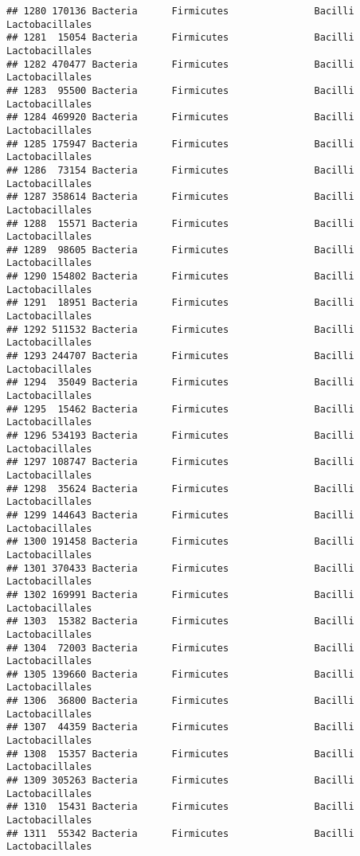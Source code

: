 \documentclass[
]{article}
\begin{document}
\begin{verbatim}
## 1280 170136 Bacteria      Firmicutes               Bacilli     Lactobacillales
## 1281  15054 Bacteria      Firmicutes               Bacilli     Lactobacillales
## 1282 470477 Bacteria      Firmicutes               Bacilli     Lactobacillales
## 1283  95500 Bacteria      Firmicutes               Bacilli     Lactobacillales
## 1284 469920 Bacteria      Firmicutes               Bacilli     Lactobacillales
## 1285 175947 Bacteria      Firmicutes               Bacilli     Lactobacillales
## 1286  73154 Bacteria      Firmicutes               Bacilli     Lactobacillales
## 1287 358614 Bacteria      Firmicutes               Bacilli     Lactobacillales
## 1288  15571 Bacteria      Firmicutes               Bacilli     Lactobacillales
## 1289  98605 Bacteria      Firmicutes               Bacilli     Lactobacillales
## 1290 154802 Bacteria      Firmicutes               Bacilli     Lactobacillales
## 1291  18951 Bacteria      Firmicutes               Bacilli     Lactobacillales
## 1292 511532 Bacteria      Firmicutes               Bacilli     Lactobacillales
## 1293 244707 Bacteria      Firmicutes               Bacilli     Lactobacillales
## 1294  35049 Bacteria      Firmicutes               Bacilli     Lactobacillales
## 1295  15462 Bacteria      Firmicutes               Bacilli     Lactobacillales
## 1296 534193 Bacteria      Firmicutes               Bacilli     Lactobacillales
## 1297 108747 Bacteria      Firmicutes               Bacilli     Lactobacillales
## 1298  35624 Bacteria      Firmicutes               Bacilli     Lactobacillales
## 1299 144643 Bacteria      Firmicutes               Bacilli     Lactobacillales
## 1300 191458 Bacteria      Firmicutes               Bacilli     Lactobacillales
## 1301 370433 Bacteria      Firmicutes               Bacilli     Lactobacillales
## 1302 169991 Bacteria      Firmicutes               Bacilli     Lactobacillales
## 1303  15382 Bacteria      Firmicutes               Bacilli     Lactobacillales
## 1304  72003 Bacteria      Firmicutes               Bacilli     Lactobacillales
## 1305 139660 Bacteria      Firmicutes               Bacilli     Lactobacillales
## 1306  36800 Bacteria      Firmicutes               Bacilli     Lactobacillales
## 1307  44359 Bacteria      Firmicutes               Bacilli     Lactobacillales
## 1308  15357 Bacteria      Firmicutes               Bacilli     Lactobacillales
## 1309 305263 Bacteria      Firmicutes               Bacilli     Lactobacillales
## 1310  15431 Bacteria      Firmicutes               Bacilli     Lactobacillales
## 1311  55342 Bacteria      Firmicutes               Bacilli     Lactobacillales

\end{verbatim}
\end{document}
